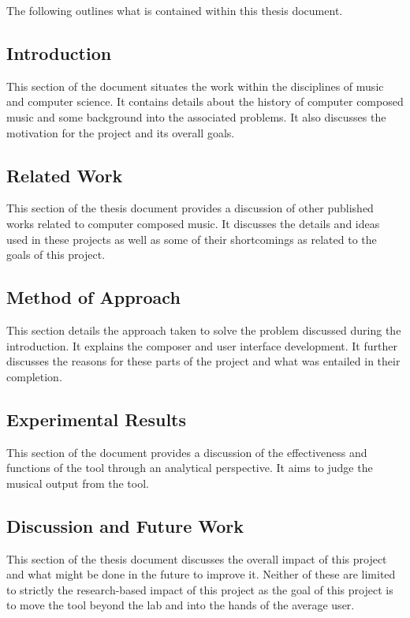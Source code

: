 The following outlines what is contained within this thesis document.

\subsection{Introduction}
\label{subsec:thesisoutlineintroduction}

This section of the document situates the work within the disciplines of music and computer science.  It contains details about the history of computer composed music and some background into the associated problems.  It also discusses the motivation for the project and its overall goals.

\subsection{Related Work}
\label{subsec:thesisoutlinerelatedwork}

This section of the thesis document provides a discussion of other published works related to computer composed music.  It discusses the details and ideas used in these projects as well as some of their shortcomings as related to the goals of this project.

\subsection{Method of Approach}
\label{subsec:thesisoutlinemethodofapproach}

This section details the approach taken to solve the problem discussed during the introduction.  It explains the composer and user interface development.  It further discusses the reasons for these parts of the project and what was entailed in their completion.

\subsection{Experimental Results}
\label{subsec:thesisoutlineexperimentalresults}

This section of the document provides a discussion of the effectiveness and functions of the tool through an analytical perspective.  It aims to judge the musical output from the tool.

\subsection{Discussion and Future Work}
\label{subsec:thesisoutlinediscusionandfuturework}

This section of the thesis document discusses the overall impact of this project and what might be done in the future to improve it.  Neither of these are limited to strictly the research-based impact of this project as the goal of this project is to move the tool beyond the lab and into the hands of the average user.